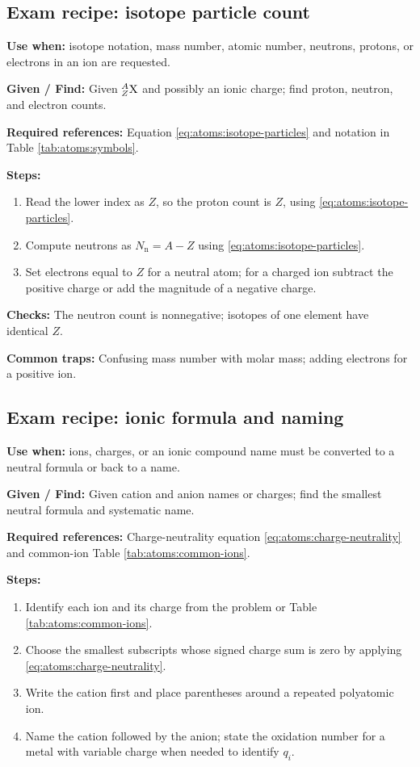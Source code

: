 \subsection{Exam recipe: isotope particle count}
\textbf{Use when:} isotope notation, mass number, atomic number, neutrons, protons, or electrons in an ion are requested.

\textbf{Given / Find:} Given \({}^{A}_{Z}\ce{X}\) and possibly an ionic charge; find proton, neutron, and electron counts.

\textbf{Required references:} Equation \eqref{eq:atoms:isotope-particles} and notation in Table \ref{tab:atoms:symbols}.

\textbf{Steps:}
\begin{enumerate}
    \item Read the lower index as \(Z\), so the proton count is \(Z\), using \eqref{eq:atoms:isotope-particles}.
    \item Compute neutrons as \(N_{\mathrm n}=A-Z\) using \eqref{eq:atoms:isotope-particles}.
    \item Set electrons equal to \(Z\) for a neutral atom; for a charged ion subtract the positive charge or add the magnitude of a negative charge.
\end{enumerate}

\textbf{Checks:} The neutron count is nonnegative; isotopes of one element have identical \(Z\).

\textbf{Common traps:} Confusing mass number with molar mass; adding electrons for a positive ion.

\subsection{Exam recipe: ionic formula and naming}
\textbf{Use when:} ions, charges, or an ionic compound name must be converted to a neutral formula or back to a name.

\textbf{Given / Find:} Given cation and anion names or charges; find the smallest neutral formula and systematic name.

\textbf{Required references:} Charge-neutrality equation \eqref{eq:atoms:charge-neutrality} and common-ion Table \ref{tab:atoms:common-ions}.

\textbf{Steps:}
\begin{enumerate}
    \item Identify each ion and its charge from the problem or Table \ref{tab:atoms:common-ions}.
    \item Choose the smallest subscripts whose signed charge sum is zero by applying \eqref{eq:atoms:charge-neutrality}.
    \item Write the cation first and place parentheses around a repeated polyatomic ion.
    \item Name the cation followed by the anion; state the oxidation number for a metal with variable charge when needed to identify \(q_i\).
\end{enumerate}

